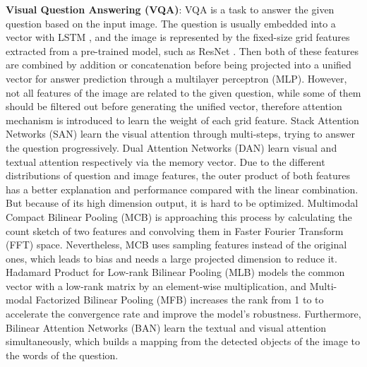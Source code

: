 \documentclass[10pt,twocolumn,letterpaper]{article}
\begin{document}
\textbf{Visual Question Answering (VQA)}: VQA is a task to answer the given question based on the input image. The question is usually embedded into a vector with LSTM \cite{hochreiter1997long}, and the image is represented by the fixed-size grid features extracted from a pre-trained model, such as ResNet \cite{he2016deep}. Then both of these features are combined by addition or concatenation \cite{antol2015vqa} before being projected into a unified vector for answer prediction through a multilayer perceptron (MLP). However, not all features of the image are related to the given question, while some of them should be filtered out before generating the unified vector, therefore attention mechanism is introduced to learn the weight of each grid feature. Stack Attention Networks (SAN) \cite{yang2016stacked} learn the visual attention through multi-steps, trying to answer the question progressively. Dual Attention Networks (DAN) \cite{nam2016dual} learn visual and textual attention respectively via the memory vector. Due to the different distributions of question and image features, the outer product of both features has a better explanation and performance compared with the linear combination. But because of its high dimension output, it is hard to be optimized. Multimodal Compact Bilinear Pooling (MCB) \cite{fukui2016multimodal} is approaching this process by calculating the count sketch of two features and convolving them in Faster Fourier Transform (FFT) space. Nevertheless, MCB uses sampling features instead of the original ones, which leads to bias and needs a large projected dimension to reduce it. Hadamard Product for Low-rank Bilinear Pooling (MLB) \cite{kim2016hadamard} models the common vector with a low-rank matrix by an element-wise multiplication, and Multi-modal Factorized Bilinear Pooling (MFB) \cite{yu2017mfb} increases the rank from 1 to  to accelerate the convergence rate and improve the model's robustness. Furthermore, Bilinear Attention Networks (BAN) \cite{kim2018bilinear} learn the textual and visual attention simultaneously, which builds a mapping from the detected objects of the image to the words of the question.
\end{document}
